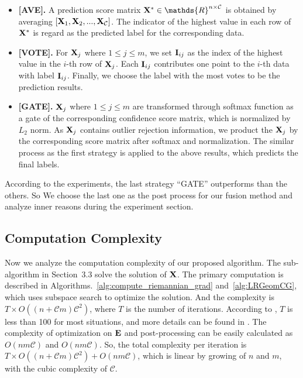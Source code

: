 \documentclass[10pt,twocolumn,letterpaper]{article}
\def\bI{{\bf I}}
\def\bE{{\bf E}}
\def\calC{{\mathcal{C}}}
\def\dsR{\mathds{R}}
\def\bX{{\bf X}}
\def\bI{{\bf I}}
\def\bX{{\bf X}}
\begin{document}
\begin{itemize}
  \item \textbf{[AVE].} A prediction score matrix $\bX^{*} \in \dsR^{n \times {\calC}}$ is obtained by averaging $[ \bX_1, \bX_2, ..., \bX_{\calC}]$.
    The indicator of the highest value in each row of $\bX^{*}$ is regard as the predicted label for the corresponding data.
  \item \textbf{[VOTE].} For $\bX_j$ where $1 \leq j \leq m$, we set $\bI_{ij}$ as the index of the highest value in the $i$-th row of $\bX_j$.
      Each $\bI_{ij}$ contributes one point to the $i$-th data with label $\bI_{ij}$.
      Finally, we choose the label with the most votes to be the prediction results.
  \item \textbf{[GATE].} $\bX_j$ where $1 \leq j \leq m$ are transformed through softmax function as a gate of the corresponding confidence score matrix, which is normalized by $L_2$ norm.
      As $\bX_j$ contains outlier rejection information, we product the $\bX_j$ by the corresponding score matrix after softmax and normalization.
      The similar process as the first strategy is applied to the above results, which predicts the final labels.
\end{itemize}
According to the experiments, the last strategy ``GATE'' outperforms than the others.
So We choose the last one as the post process for our fusion method and analyze inner reasons during the experiment section.

\subsection{Computation Complexity}

Now we analyze the computation complexity of our proposed algorithm.
The sub-algorithm in Section~3.3 solve the solution of $\bX$.
The primary computation is described in Algorithms.~\ref{alg:compute_riemannian_grad} and~\ref{alg:LRGeomCG},
which uses subspace search to optimize the solution.
And the complexity is $T \times O((n+{\calC}m){\calC}^2)$, where $T$ is the number of iterations.
According to \cite{vandereycken2013lowrank}, $T$ is less than 100 for most situations,
and more details can be found in \cite{vandereycken2013lowrank}.
The complexity of optimization on $\bE$ and post-processing can be easily calculated as $O(nm{\calC})$ and $O(nm{\calC})$.
So, the total complexity per iteration is $T \times O((n+{\calC}m){\calC}^2) + O(nm{\calC})$,
which is linear by growing of $n$ and $m$, with the cubic complexity of $\calC$.
\end{document}
